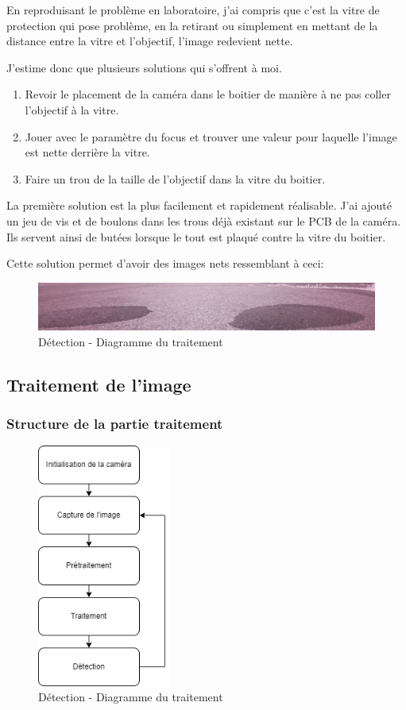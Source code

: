 En reproduisant le problème en laboratoire, j'ai compris que c'est la vitre de protection qui pose problème, en la retirant ou simplement en mettant de la distance entre la vitre et l'objectif, l'image redevient nette.

J'estime donc que plusieurs solutions qui s'offrent à moi.
\begin{enumerate}
    \item Revoir le placement de la caméra dans le boitier de manière à ne pas coller l'objectif à la vitre.
    \item Jouer avec le paramètre du focus et trouver une valeur pour laquelle l'image est nette derrière la vitre.
    \item Faire un trou de la taille de l'objectif dans la vitre du boitier.
\end{enumerate}

La première solution est la plus facilement et rapidement réalisable. J'ai ajouté un jeu de vis et de boulons dans les trous déjà existant sur le PCB de la caméra.
Ils servent ainsi de butées lorsque le tout est plaqué contre la vitre du boitier.

Cette solution permet d'avoir des images nets ressemblant à ceci:
\begin{figure}[H]
    \centering
    \includegraphics[width=13cm]{assets/figures/oil_test.png}
    \caption{Détection - Diagramme du traitement}
\end{figure}
\newpage

\subsection{Traitement de l'image}
\subsubsection{Structure de la partie traitement}
\begin{figure}[H]
    \centering
    \includegraphics[height=8cm]{assets/figures/diagramme_traitement.png}
    \caption{Détection - Diagramme du traitement}
\end{figure}

